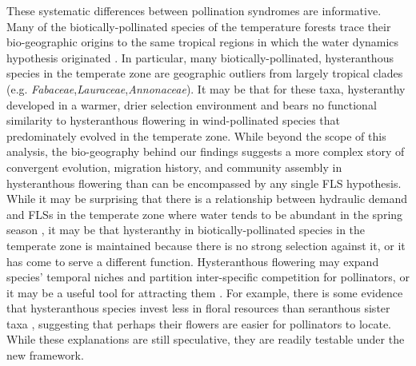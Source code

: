 \documentclass{article}
\begin{document}
\noindent These systematic differences between pollination syndromes are informative. Many of the biotically-pollinated species of the temperature forests trace their bio-geographic origins to the same tropical regions \citep{Daubenmire1972} in which the water dynamics hypothesis originated \citep{Janzen1967,Franklin2016}. In particular, many biotically-pollinated, hysteranthous species in the temperate zone are geographic outliers from largely tropical clades (e.g. \textit{Fabaceae},\textit{Lauraceae},\textit{Annonaceae}). It may be that for these taxa, hysteranthy developed in a warmer, drier selection environment and bears no functional similarity to hysteranthous flowering in wind-pollinated species that predominately evolved in the temperate zone. While beyond the scope of this analysis, the bio-geography behind our findings suggests a more complex story of convergent evolution, migration history, and community assembly in hysteranthous flowering than can be encompassed by any single FLS hypothesis.\\

\noindent While it may be surprising that there is a relationship between hydraulic demand and FLSs in the temperate zone where water tends to be abundant in the spring season \citep{Polgar2011}, it may be that hysteranthy in biotically-pollinated species in the temperate zone is maintained because there is no strong selection against it, or it has come to serve a different function. Hysteranthous flowering may expand species' temporal niches and partition inter-specific competition for pollinators, or it may be a useful tool for attracting them \citep{Janzen1967}. For example, there is some evidence that hysteranthous species invest less in floral resources than seranthous sister taxa \citep{Gunatilleke1984}, suggesting that perhaps their flowers are easier for pollinators to locate. While these explanations are still speculative, they are readily testable under the new framework.\\

\end{document}

